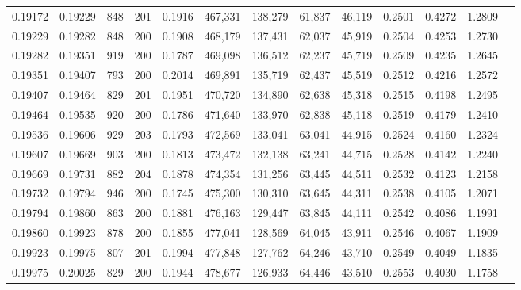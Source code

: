 \begin{tabular}{rrrrrrrrrrrrr}
0.19172 & 0.19229 &   848 & 201 &                                     0.1916 & 467,331 & 138,279 &  61,837 &  46,119 & 0.2501 & 0.4272 & 1.2809 \\
0.19229 & 0.19282 &   848 & 200 &                                     0.1908 & 468,179 & 137,431 &  62,037 &  45,919 & 0.2504 & 0.4253 & 1.2730 \\
0.19282 & 0.19351 &   919 & 200 &                                     0.1787 & 469,098 & 136,512 &  62,237 &  45,719 & 0.2509 & 0.4235 & 1.2645 \\
0.19351 & 0.19407 &   793 & 200 &                                     0.2014 & 469,891 & 135,719 &  62,437 &  45,519 & 0.2512 & 0.4216 & 1.2572 \\
0.19407 & 0.19464 &   829 & 201 &                                     0.1951 & 470,720 & 134,890 &  62,638 &  45,318 & 0.2515 & 0.4198 & 1.2495 \\
0.19464 & 0.19535 &   920 & 200 &                                     0.1786 & 471,640 & 133,970 &  62,838 &  45,118 & 0.2519 & 0.4179 & 1.2410 \\
0.19536 & 0.19606 &   929 & 203 &                                     0.1793 & 472,569 & 133,041 &  63,041 &  44,915 & 0.2524 & 0.4160 & 1.2324 \\
0.19607 & 0.19669 &   903 & 200 &                                     0.1813 & 473,472 & 132,138 &  63,241 &  44,715 & 0.2528 & 0.4142 & 1.2240 \\
0.19669 & 0.19731 &   882 & 204 &                                     0.1878 & 474,354 & 131,256 &  63,445 &  44,511 & 0.2532 & 0.4123 & 1.2158 \\
0.19732 & 0.19794 &   946 & 200 &                                     0.1745 & 475,300 & 130,310 &  63,645 &  44,311 & 0.2538 & 0.4105 & 1.2071 \\
0.19794 & 0.19860 &   863 & 200 &                                     0.1881 & 476,163 & 129,447 &  63,845 &  44,111 & 0.2542 & 0.4086 & 1.1991 \\
0.19860 & 0.19923 &   878 & 200 &                                     0.1855 & 477,041 & 128,569 &  64,045 &  43,911 & 0.2546 & 0.4067 & 1.1909 \\
0.19923 & 0.19975 &   807 & 201 &                                     0.1994 & 477,848 & 127,762 &  64,246 &  43,710 & 0.2549 & 0.4049 & 1.1835 \\
0.19975 & 0.20025 &   829 & 200 &                                     0.1944 & 478,677 & 126,933 &  64,446 &  43,510 & 0.2553 & 0.4030 & 1.1758 \\

\end{tabular}
